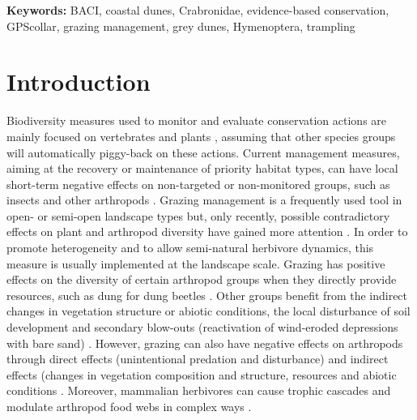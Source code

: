 \documentclass[10pt, twoside]{book} %
\begin{document}
\vspace*{\fill}		
\noindent \textbf{Keywords:} BACI, coastal dunes, Crabronidae, evidence-based conservation, GPScollar, grazing management, grey dunes, Hymenoptera, trampling
	
\clearpage
	
	\section{Introduction}
	Biodiversity measures used to monitor and evaluate conservation actions are mainly focused on vertebrates and plants \citep{clark2002}, assuming that other species groups will automatically piggy-back on these actions. Current management measures, aiming at the recovery or maintenance of priority habitat types, can have local short-term negative effects on non-targeted or non-monitored groups, such as insects and other arthropods \citep{vanklink2018}. Grazing management is a frequently used tool in open- or semi-open landscape types but, only recently, possible contradictory effects on plant and arthropod diversity have gained more attention \citep{mysterud2005, vanklink2015}. In order to promote heterogeneity and to allow semi-natural herbivore dynamics, this measure is usually implemented at the landscape scale. Grazing has positive effects on the diversity of certain arthropod groups when they directly provide resources, such as dung for dung beetles \citep{verdu2007}. Other groups benefit from the indirect changes in vegetation structure or abiotic conditions, the local disturbance of soil development and secondary blow-outs (reactivation of wind-eroded depressions with bare sand) \citep[e.g.][]{bonte2000, wallisdevries2001, maes2006, maes2006a}. However, grazing can also have negative effects on arthropods through direct effects (unintentional predation and disturbance) and indirect effects (changes in vegetation composition and structure, resources and abiotic conditions \citep{maes2006, poyry2006, vanklink2015, broder2019}. Moreover, mammalian herbivores can cause trophic cascades and modulate arthropod food webs in complex ways \citep{vandegehuchte2017a}.\\
	
\end{document}
